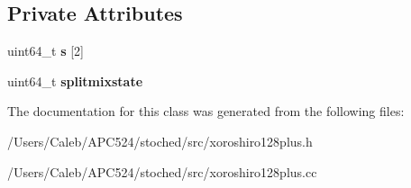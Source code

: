 \subsection*{Private Attributes}
\begin{DoxyCompactItemize}
\item 
\mbox{\label{classxoroshiro128plus_a50f3b4f14b1a5b3034d4cf3e6dde2b10}} 
uint64\+\_\+t {\bfseries s} \mbox{[}2\mbox{]}
\item 
\mbox{\label{classxoroshiro128plus_acdcc17b31842b463c1a00360b182b3aa}} 
uint64\+\_\+t {\bfseries splitmixstate}
\end{DoxyCompactItemize}


The documentation for this class was generated from the following files\+:\begin{DoxyCompactItemize}
\item 
/\+Users/\+Caleb/\+A\+P\+C524/stoched/src/xoroshiro128plus.\+h\item 
/\+Users/\+Caleb/\+A\+P\+C524/stoched/src/xoroshiro128plus.\+cc\end{DoxyCompactItemize}
